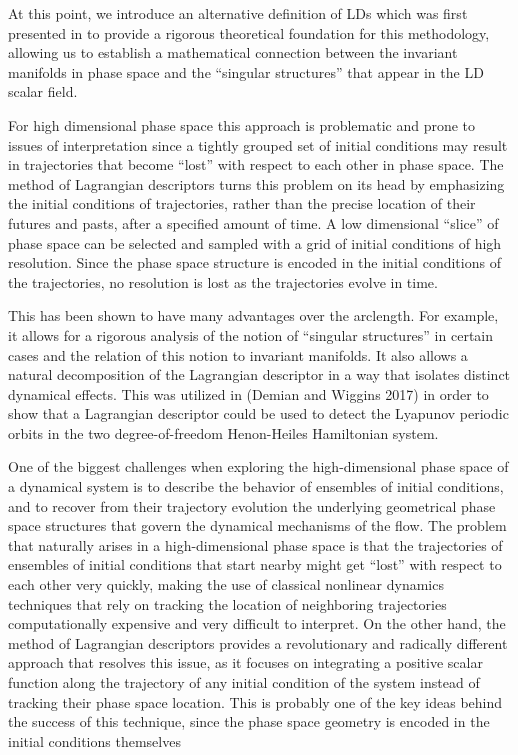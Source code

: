 \documentclass[8pt]{article}
\begin{document}
At this point, we introduce an alternative definition of LDs which was first presented in \cite{lopesino2017} to provide a rigorous theoretical foundation for this methodology, allowing us to establish a mathematical connection between the invariant manifolds in phase space and the ``singular structures'' that appear in the LD scalar field.

\newpage

For high dimensional phase space this approach is problematic and prone to issues of interpretation since a tightly grouped set of initial conditions may result in trajectories that become “lost” with respect to each other in phase space. The method of Lagrangian descriptors turns this problem on its head by emphasizing the initial conditions of trajectories, rather than the precise location of their futures and pasts, after a specified amount of time.  A low dimensional “slice” of phase space can be selected and sampled with a grid of initial conditions of high resolution. Since the phase space structure is encoded in the initial conditions of the trajectories, no resolution is lost as the trajectories evolve in time.

This has been shown to have many advantages over the arclength. For example, it allows for a rigorous analysis of the notion of “singular structures” in certain cases and the relation of this notion to invariant manifolds. It also allows a natural decomposition of the Lagrangian descriptor in a way that isolates distinct dynamical effects. This was utilized in (Demian and Wiggins 2017) in order to show that a Lagrangian descriptor could be used to detect the Lyapunov periodic orbits in the two degree-of-freedom Henon-Heiles Hamiltonian system.








	

One of the biggest challenges when exploring the high-dimensional phase space of a dynamical system is to describe the behavior of ensembles of initial conditions, and to recover from their trajectory evolution the underlying geometrical phase space structures that govern the dynamical mechanisms of the flow. The problem that naturally arises in a   high-dimensional phase space is that the trajectories of ensembles of initial conditions that start nearby might get ``lost'' with respect to each other very quickly, making the use of classical nonlinear dynamics techniques that rely on tracking the location of neighboring trajectories computationally expensive and very difficult to interpret. On the other hand, the method of Lagrangian descriptors provides a revolutionary and radically different approach that resolves this issue, as it focuses on integrating a positive scalar function along the trajectory of any initial condition of the system instead of tracking their phase space location. This is probably one of the key ideas behind the success of this technique, since the phase space geometry is encoded in the initial conditions themselves
\end{document}
